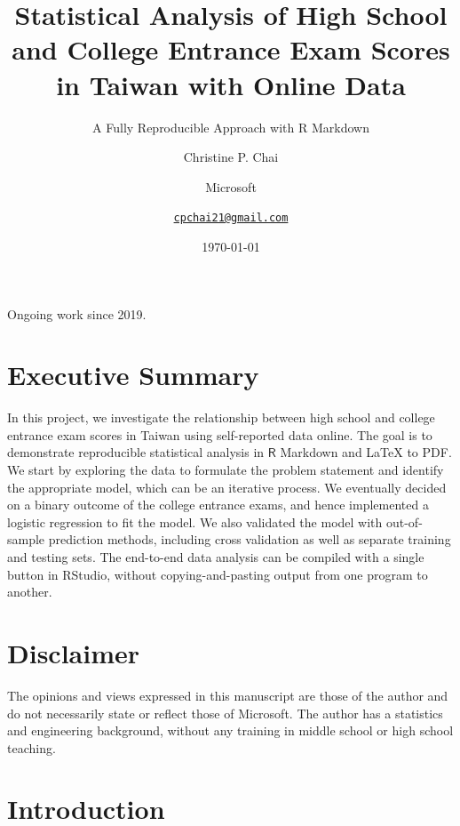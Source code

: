 \documentclass[
]{article}
\title{Statistical Analysis of High School and College Entrance Exam
Scores in Taiwan with Online Data}
\subtitle{A Fully Reproducible Approach with R Markdown}
\author{Christine P.
Chai \and Microsoft \and \href{mailto:cpchai21@gmail.com}{\nolinkurl{cpchai21@gmail.com}}}
\date{\today}
\begin{document}
\maketitle

\renewcommand{\cite}{\citep}

Ongoing work since 2019.

\hypertarget{executive-summary}{%
\section*{Executive Summary}\label{executive-summary}}

In this project, we investigate the relationship between high school and
college entrance exam scores in Taiwan using self-reported data online.
The goal is to demonstrate reproducible statistical analysis in
\(\mathsf{R}\) Markdown and LaTeX to PDF. We start by exploring the data
to formulate the problem statement and identify the appropriate model,
which can be an iterative process. We eventually decided on a binary
outcome of the college entrance exams, and hence implemented a logistic
regression to fit the model. We also validated the model with
out-of-sample prediction methods, including cross validation as well as
separate training and testing sets. The end-to-end data analysis can be
compiled with a single button in RStudio, without copying-and-pasting
output from one program to another.

\hypertarget{disclaimer}{%
\section*{Disclaimer}\label{disclaimer}}

The opinions and views expressed in this manuscript are those of the
author and do not necessarily state or reflect those of Microsoft. The
author has a statistics and engineering background, without any training
in middle school or high school teaching.

\hypertarget{intro}{%
\section{Introduction}\label{intro}}
\end{document}
